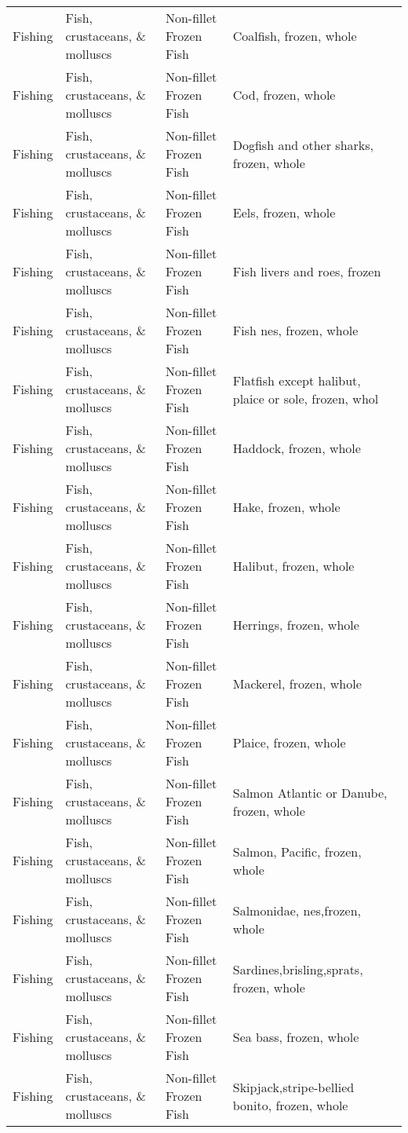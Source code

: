 \begin{appendices}
\begin{xltabular}{\textwidth}{|p{0.10\textwidth}|p{0.27\textwidth}|p{0.25\textwidth}|p{0.26\textwidth}|}
Fishing & Fish, crustaceans, \& molluscs & Non-fillet Frozen Fish & Coalfish, frozen, whole \\
Fishing & Fish, crustaceans, \& molluscs & Non-fillet Frozen Fish & Cod, frozen, whole \\
Fishing & Fish, crustaceans, \& molluscs & Non-fillet Frozen Fish & Dogfish and other sharks, frozen, whole \\
Fishing & Fish, crustaceans, \& molluscs & Non-fillet Frozen Fish & Eels, frozen, whole \\
Fishing & Fish, crustaceans, \& molluscs & Non-fillet Frozen Fish & Fish livers and roes, frozen \\
Fishing & Fish, crustaceans, \& molluscs & Non-fillet Frozen Fish & Fish nes, frozen, whole \\
Fishing & Fish, crustaceans, \& molluscs & Non-fillet Frozen Fish & Flatfish except halibut, plaice or sole, frozen, whol \\
Fishing & Fish, crustaceans, \& molluscs & Non-fillet Frozen Fish & Haddock, frozen, whole \\
Fishing & Fish, crustaceans, \& molluscs & Non-fillet Frozen Fish & Hake, frozen, whole \\
Fishing & Fish, crustaceans, \& molluscs & Non-fillet Frozen Fish & Halibut, frozen, whole \\
Fishing & Fish, crustaceans, \& molluscs & Non-fillet Frozen Fish & Herrings, frozen, whole \\
Fishing & Fish, crustaceans, \& molluscs & Non-fillet Frozen Fish & Mackerel, frozen, whole \\
Fishing & Fish, crustaceans, \& molluscs & Non-fillet Frozen Fish & Plaice, frozen, whole \\
Fishing & Fish, crustaceans, \& molluscs & Non-fillet Frozen Fish & Salmon Atlantic or Danube, frozen, whole \\
Fishing & Fish, crustaceans, \& molluscs & Non-fillet Frozen Fish & Salmon, Pacific, frozen, whole \\
Fishing & Fish, crustaceans, \& molluscs & Non-fillet Frozen Fish & Salmonidae, nes,frozen, whole \\
Fishing & Fish, crustaceans, \& molluscs & Non-fillet Frozen Fish & Sardines,brisling,sprats, frozen, whole \\
Fishing & Fish, crustaceans, \& molluscs & Non-fillet Frozen Fish & Sea bass, frozen, whole \\
Fishing & Fish, crustaceans, \& molluscs & Non-fillet Frozen Fish & Skipjack,stripe-bellied bonito, frozen, whole \\

\end{xltabular}
\end{appendices}
